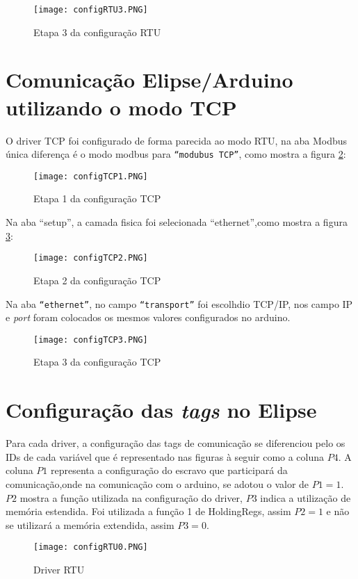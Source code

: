 \begin{figure}[H]
	\centering
	\texttt{[image: configRTU3.PNG]}
	\caption{Etapa 3 da configuração RTU}
	\label{fig:rtu_config3}
\end{figure}

\section{Comunicação Elipse/Arduino utilizando o modo TCP}
O driver TCP foi configurado de forma parecida ao modo RTU, na aba Modbus única diferença é o modo modbus para \verb|“modubus TCP”|, como mostra a figura \ref{fig:tcp_config1}:
\begin{figure}[H]
	\centering
	\texttt{[image: configTCP1.PNG]}
	\caption{Etapa 1 da configuração TCP}
	\label{fig:tcp_config1}
\end{figure}
Na aba “setup”, a camada fisica foi selecionada “ethernet”,como mostra a figura \ref{fig:tcp_config2}:
\begin{figure}[H]
	\centering
	\texttt{[image: configTCP2.PNG]}
	\caption{Etapa 2 da configuração TCP}
	\label{fig:tcp_config2}
\end{figure}
Na aba \verb|“ethernet”|, no campo \verb|“transport”| foi escolhdio TCP/IP, nos campo IP e \textit{port} foram colocados os mesmos valores configurados no arduino.

\begin{figure}[H]
	\centering
	\texttt{[image: configTCP3.PNG]}
	\caption{Etapa 3 da configuração TCP}
	\label{fig:tcp_config3}
\end{figure}
\section{Configuração das \textit{tags} no Elipse}
Para cada driver, a configuração das tags de comunicação se diferenciou pelo os IDs de cada variável que é representado nas figuras à seguir como a coluna $P4$. A coluna $P1$ representa a configuração do escravo que participará da comunicação,onde na comunicação com o arduino, se adotou o valor de $P1= 1$. $P2$ mostra a função utilizada na configuração do driver, $P3$ indica a utilização de memória estendida. Foi utilizada a função 1 de HoldingRegs, assim $P2= 1$ e não se utilizará a memória extendida, assim $P3 =0$.
\begin{figure}[H]
	\centering
	\texttt{[image: configRTU0.PNG]}
	\caption{Driver RTU}
	\label{fig:driver_rtu}
\end{figure}

